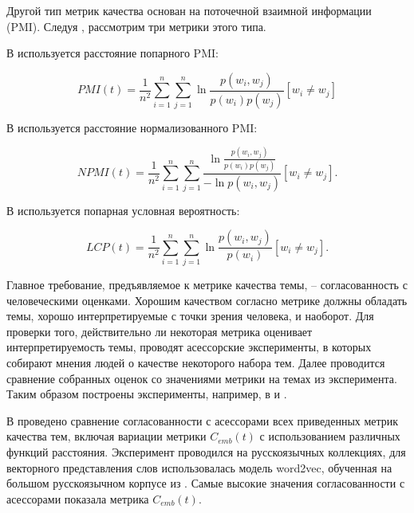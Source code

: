 Другой тип метрик качества основан на поточечной взаимной информации (PMI). Следуя \cite{Lau2014}, рассмотрим три метрики этого типа.

В \cite{Newman2010} используется расстояние попарного PMI:

$$PMI(t) =  \dfrac{1}{n^2}\sum\limits_{i=1}^n \sum\limits_{j=1}^n  \ln{\frac{p(w_i, w_j)}{p(w_i) p(w_j)}}[w_i \neq w_j]$$

В \cite{Bouma2009} используется расстояние нормализованного PMI:

$$NPMI(t) =\dfrac{1}{n^2}\sum\limits_{i=1}^n \sum\limits_{j=1}^n   \dfrac{\ln{\frac{p(w_i, w_j)}{p(w_i) p(w_j)}}}{-\ln p(w_i, w_j)}[w_i \neq w_j].$$

В \cite{Mimno2011} используется попарная условная вероятность:

$$LCP(t) = \dfrac{1}{n^2}\sum\limits_{i=1}^n \sum\limits_{j=1}^n \ln\frac{p(w_i, w_j)}{p(w_i)} [w_i \neq w_j].$$

Главное требование, предъявляемое к метрике качества темы, -- согласованность с человеческими оценками. Хорошим качеством согласно метрике должны обладать темы, хорошо интерпретируемые с точки зрения человека, и наоборот. Для проверки того, действительно ли некоторая метрика оценивает интерпретируемость темы, проводят асессорские эксперименты, в которых собирают мнения людей о качестве некоторого набора тем. Далее проводится сравнение собранных оценок со значениями метрики на темах из эксперимента. Таким образом построены эксперименты, например, в \cite{Mimno2011} и \cite{Nikolenko2016}.

В \cite{Nikolenko2016} проведено сравнение согласованности с асессорами всех приведенных метрик качества тем, включая вариации метрики $C_{emb}(t)$ с использованием различных функций расстояния. Эксперимент проводился на русскоязычных коллекциях, для векторного представления слов использовалась модель word2vec, обученная на большом русскоязычном корпусе из \cite{Panchenko2015}. Самые высокие значения согласованности с асессорами показала метрика $C_{emb}(t)$.


 

 







